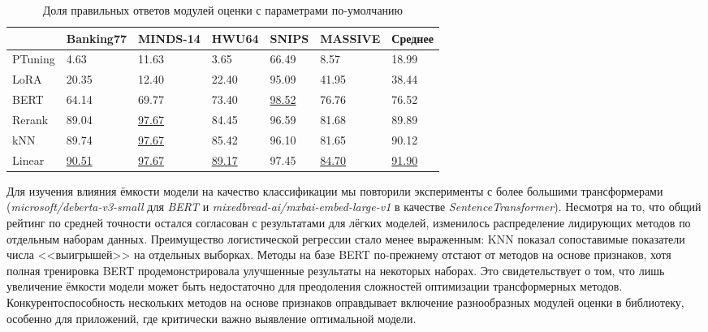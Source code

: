 \documentclass[14pt,a4paper,oneside,openany]{extbook}
\begin{document}
\begin{table}[h!]
\caption{\label{tbl:light_modules}Доля правильных ответов модулей оценки с параметрами по-умолчанию}
\centering
\begin{tabular}{|p{2cm}|p{2cm}|p{2cm}|p{2cm}|p{2cm}|p{2cm}|p{2cm}|}
\hline
 & Banking77 & MINDS-14 & HWU64 & SNIPS & MASSIVE & Среднее\\
\hline
PTuning & 4.63 & 11.63 & 3.65 & 66.49 & 8.57 & 18.99\\
\hline
LoRA & 20.35 & 12.40 & 22.40 & 95.09 & 41.95 & 38.44\\
\hline
BERT & 64.14 & 69.77 & 73.40 & \uline{98.52} & 76.76 & 76.52\\
\hline
Rerank & 89.04 & \uline{97.67} & 84.45 & 96.59 & 81.68 & 89.89\\
\hline
kNN & 89.74 & \uline{97.67} & 85.42 & 96.10 & 81.65 & 90.12\\
\hline
Linear & \uline{90.51} & \uline{97.67} & \uline{89.17} & 97.45 & \uline{84.70} & \uline{91.90}\\
\hline
\end{tabular}
\end{table}
Для изучения влияния ёмкости модели на качество классификации мы повторили эксперименты с более большими трансформерами (\emph{microsoft/deberta-v3-small}\autocite{he_debertav3_2023} для \emph{BERT} и \emph{mixedbread-ai/mxbai-embed-large-v1}\autocite{li_angleoptimized_2024} в качестве \emph{SentenceTransformer}). Несмотря на то, что общий рейтинг по средней точности остался согласован с результатами для лёгких моделей, изменилось распределение лидирующих методов по отдельным наборам данных. Преимущество логистической регрессии стало менее выраженным: KNN показал сопоставимые показатели числа {}<<выигрышей>>{} на отдельных выборках. Методы на базе BERT по-прежнему отстают от методов на основе признаков, хотя полная тренировка BERT продемонстрировала улучшенные результаты на некоторых наборах. Это свидетельствует о том, что лишь увеличение ёмкости модели может быть недостаточно для преодоления сложностей оптимизации трансформерных методов. Конкурентоспособность нескольких методов на основе признаков оправдывает включение разнообразных модулей оценки в библиотеку, особенно для приложений, где критически важно выявление оптимальной модели.
\end{document}
